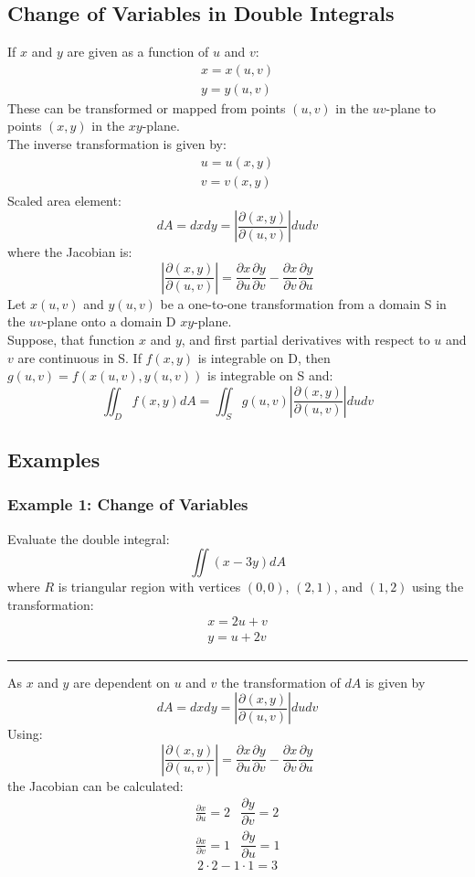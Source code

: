 \subsection{Change of Variables in Double Integrals}
If $x$ and $y$ are given as a function of $u$ and $v$:
$$\begin{array}{c}
x=x(u,v)\\
y=y(u,v)
\end{array}$$
These can be transformed or mapped from points $(u,v)$ in the $uv$-plane to points $(x,y)$ in the $xy$-plane.\\
The inverse transformation is given by:
$$\begin{array}{c}
  u=u(x,y)\\
  v=v(x,y)
\end{array}$$
Scaled area element:
$$dA = dxdy=\left|\frac{\partial(x,y)}{\partial(u,v)}\right|dudv$$
where the Jacobian is:
$$\left|\frac{\partial(x,y)}{\partial(u,v)}\right|=\frac{\partial x}{\partial u}\frac{\partial y}{\partial v}-\frac{\partial x}{\partial v}\frac{\partial y}{\partial u}$$
Let $x(u, v)$ and $y(u,v)$ be a one-to-one transformation from a domain S in the $uv$-plane onto a domain D
$xy$-plane.\\
Suppose, that function $x$ and $y$, and first partial derivatives with respect to $u$ and $v$ are continuous in S.
If $f(x,y)$ is integrable on D, then $g(u,v)=f(x(u,v),y(u,v))$ is integrable on S and:
$$\iint_D f(x,y)dA=\iint_S g(u,v)\left|\frac{\partial(x,y)}{\partial(u,v)}\right|dudv$$

\subsection{Examples}
\subsubsection{Example 1: Change of Variables}
Evaluate the double integral:
$$\iint (x-3y)dA$$
where $R$ is triangular region with vertices $(0,0)$, $(2,1)$, and $(1,2)$ using the transformation:
$$\begin{array}{c}
  x=2u+v\\
  y=u+2v
\end{array}$$
\noindent\rule{\textwidth}{1pt}
As $x$ and $y$ are dependent on $u$ and $v$ the transformation of $dA$ is given by 
$$dA = dxdy=\left|\frac{\partial(x,y)}{\partial(u,v)}\right|dudv$$
Using:
$$\left|\frac{\partial(x,y)}{\partial(u,v)}\right|=\frac{\partial x}{\partial u}\frac{\partial y}{\partial v}-\frac{\partial x}{\partial v}\frac{\partial y}{\partial u}$$
the Jacobian can be calculated:
\begin{eqnarray*}
  \frac{\partial x}{\partial u}=2&
  \dfrac{\partial y}{\partial v}=2\\
  \frac{\partial x}{\partial v}=1&
  \dfrac{\partial y}{\partial u}=1
\end{eqnarray*}
$$2\cdot2-1\cdot1=3$$

